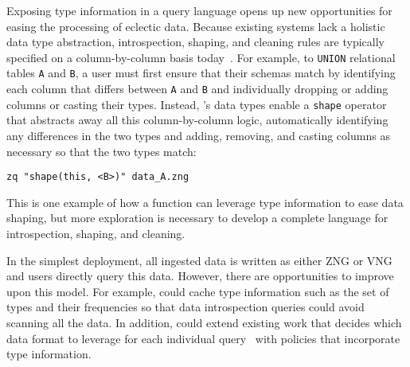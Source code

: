  Exposing type information in a query language opens up new opportunities for easing the processing of eclectic data. Because existing systems lack a holistic data type abstraction, introspection, shaping, and cleaning rules are typically specified on a column-by-column basis today~\cite{bidel, codel}. For example, to \texttt{UNION} relational tables \texttt{A} and \texttt{B}, a user must first ensure that their schemas match by identifying each column that differs between \texttt{A} and \texttt{B} and individually dropping or adding columns or casting their types. Instead, \sys{}'s data types enable a \texttt{shape} operator that abstracts away all this column-by-column logic, automatically identifying any differences in the two types and adding, removing, and casting columns as necessary so that the two types match:

\texttt{zq "shape(this, <B>)" data\_A.zng}

\noindent{}This is one example of how a function can leverage type information to ease data shaping, but more exploration is necessary to develop a complete language for introspection, shaping, and cleaning.

 In the simplest \sys{} deployment, all ingested data is written as either ZNG or VNG and users directly query this data. However, there are opportunities to improve upon this model. For example, \sys{} could cache type information such as the set of types and their frequencies so that data introspection queries could avoid scanning all the data. In addition, \sys{} could extend existing work that decides which data format to leverage for each individual query~\cite{octopusdb, h2o,peloton,tidb,one_size_fits_all_2007} with policies that incorporate type information.




